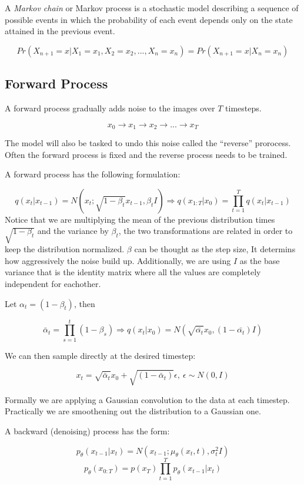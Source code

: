 \documentclass{article}
\begin{document}
A \emph{Markov chain} or Markov process is a stochastic model describing
a sequence of possible events in which the probability of each event
depends only on the state attained in the previous event.

\[Pr(X_{n+1}=x|X_1=x_1, X_2 = x_2, ..., X_n = x_n)=Pr(X_{n+1}=x|X_{n}=x_n)\]

\subsection{Forward Process}\label{forward-process}

A forward process gradually adds noise to the images over \(T\)
timesteps.

\[x_0\rightarrow x_1 \rightarrow x_2 \rightarrow ... \rightarrow x_T\]

The model will also be tasked to undo this noise called the ``reverse''
prorocess. Often the forward process is fixed and the reverse process
needs to be trained.

A forward process has the following formulation:

\[q(x_t|x_{t-1})=N(x_t; \sqrt{1-\beta_t}x_{t-1},\beta_t I)\Rightarrow q(x_{1:T}|x_0)=\prod_{t=1}^Tq(x_t|x_{t-1})\]
Notice that we are multiplying the mean of the previous distribution
times \(\sqrt{1-\beta_t}\) and the variance by \(\beta_t\), the two
transformations are related in order to keep the distribution
normalized. \(\beta\) can be thought as the step size, It determins how
aggressively the noise build up. Additionally, we are using \(I\) as the
base variance that is the identity matrix where all the values are
completely independent for eachother.

Let \(\alpha_t = (1-\beta_t)\), then

\[\bar{\alpha}_t=\prod_{s=1}^t(1-\beta_s)\Rightarrow q(x_t|x_0)=N(\sqrt{\bar{\alpha_t}}x_0, (1-\bar{\alpha_t})I)\]

We can then sample directly at the desired timestep:

\[x_t=\sqrt{\bar{\alpha}_t}x_0 + \sqrt{(1-\bar{\alpha}_t)}\epsilon,\ \epsilon \sim N(0, I)\]

Formally we are applying a Gaussian convolution to the data at each
timestep. Practically we are smoothening out the distribution to a
Gaussian one.

A backward (denoising) process has the form:

\[p_\theta (x_{t-1}|x_t)=N(x_{t-1};\mu_\theta (x_t, t), \sigma_t^2I)\]
\[p_\theta (x_{0:T})=p(x_T)\prod_{t=1}^Tp_\theta (x_{t-1}|x_t)\]
\end{document}
